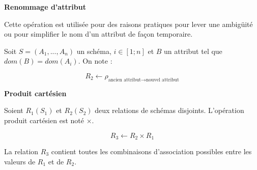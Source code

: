 \documentclass[10pt]{article}
\begin{document}
\begin{defi}
\textbf{Renommage d'attribut}

Cette opération est utilisée pour des raisons pratiques pour lever une ambigüité ou pour simplifier le nom d'un attribut de façon temporaire. 

Soit $S = (A_1,... ,A_n)$ un schéma, $ i \in[1;n]$ et $B$ un attribut tel que
$dom(B) = dom(A_i)$. On note :

$$
R_2 \leftarrow \rho_{\text{ancien attribut} \rightarrow \text{nouvel attribut}}
$$
\end{defi}



\begin{defi}

\textbf{Produit cartésien}

Soient $R_1(S_1)$ et $R_2(S_2)$ deux relations de schémas disjoints. L'opération produit cartésien est noté $\times$. 

$$
R_3 \leftarrow R_2 \times R_1
$$

La relation $R_3$ contient toutes les combinaisons d'association possibles entre les valeurs de $R_1$ et de $R_2$.

\end{defi}


\begin{thebibliography}{2}
\end{thebibliography}
\end{document}
